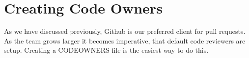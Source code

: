 \maketitle{}
\section{ Creating Code Owners }

As we have discussed previously, Github is our preferred client for pull
requests. As the team grows larger it becomes imperative, that default code
reviewers are setup. Creating a CODEOWNERS file is the easiest way to do this.
